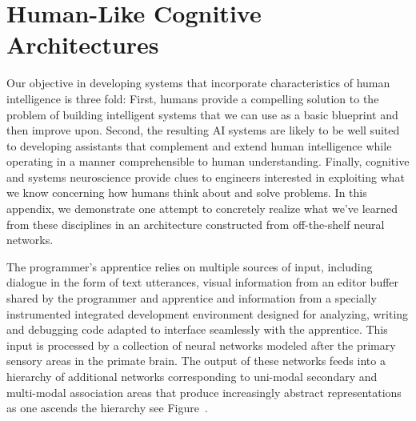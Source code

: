 
\section{Human-Like Cognitive Architectures}


Our objective in developing systems that incorporate characteristics of human intelligence is three fold: First, humans provide a compelling solution to the problem of building intelligent systems that we can use as a basic blueprint and then improve upon. Second, the resulting AI systems are likely to be well suited to developing assistants that complement and extend human intelligence while operating in a manner comprehensible to human understanding. Finally, cognitive and systems neuroscience provide clues to engineers interested in exploiting what we know concerning how humans think about and solve problems. In this appendix, we demonstrate one attempt to concretely realize what we've learned from these disciplines in an architecture constructed from off-the-shelf neural networks. 

The programmer's apprentice relies on multiple sources of input, including dialogue in the form of text utterances, visual information from an editor buffer shared by the programmer and apprentice and information from a specially instrumented integrated development environment designed for analyzing, writing and debugging code adapted to interface seamlessly with the apprentice. This input is processed by a collection of neural networks modeled after the primary sensory areas in the primate brain. The output of these networks feeds into a hierarchy of additional networks corresponding to uni-modal secondary and multi-modal association areas that produce increasingly abstract representations as one ascends the hierarchy \emdash{} see Figure~{}.
  

\setcounter{figure}{49}


